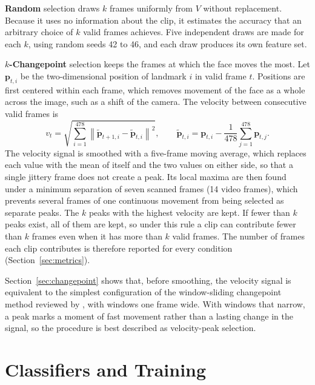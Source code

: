 \textbf{Random} selection draws $k$ frames uniformly from $V$ without replacement. Because it uses no information about the clip, it estimates the accuracy that an arbitrary choice of $k$ valid frames achieves. Five independent draws are made for each $k$, using random seeds 42 to 46, and each draw produces its own feature set.

\textbf{$k$-Changepoint} selection keeps the frames at which the face moves the most. Let $\mathbf{p}_{t,i}$ be the two-dimensional position of landmark $i$ in valid frame $t$. Positions are first centered within each frame, which removes movement of the face as a whole across the image, such as a shift of the camera. The velocity between consecutive valid frames is
\begin{equation}
   v_t = \sqrt{\sum_{i=1}^{478} \left\lVert \tilde{\mathbf{p}}_{t+1,i} - \tilde{\mathbf{p}}_{t,i} \right\rVert^2},
   \qquad
   \tilde{\mathbf{p}}_{t,i} = \mathbf{p}_{t,i} - \frac{1}{478} \sum_{j=1}^{478} \mathbf{p}_{t,j}.
   \label{eq:velocity}
\end{equation}
The velocity signal is smoothed with a five-frame moving average, which replaces each value with the mean of itself and the two values on either side, so that a single jittery frame does not create a peak. Its local maxima are then found under a minimum separation of seven scanned frames (14 video frames), which prevents several frames of one continuous movement from being selected as separate peaks. The $k$ peaks with the highest velocity are kept. If fewer than $k$ peaks exist, all of them are kept, so under this rule a clip can contribute fewer than $k$ frames even when it has more than $k$ valid frames. The number of frames each clip contributes is therefore reported for every condition (Section~\ref{sec:metrics}).

Section~\ref{sec:changepoint} shows that, before smoothing, the velocity signal is equivalent to the simplest configuration of the window-sliding changepoint method reviewed by , with windows one frame wide. With windows that narrow, a peak marks a moment of fast movement rather than a lasting change in the signal, so the procedure is best described as velocity-peak selection.



\section{Classifiers and Training}
\label{sec:training}


